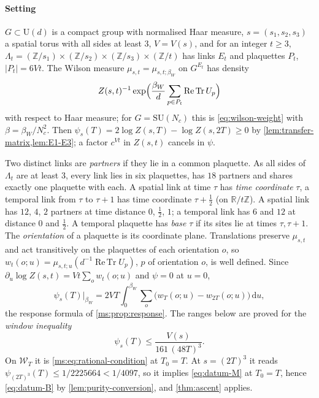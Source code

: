 \documentclass[11pt,a4paper]{amsart}
\theoremstyle{definition}
\theoremstyle{remark}
\numberwithin{equation}{section}
\DeclareMathOperator{\ReTr}{Re\,Tr}  %
\newcommand{\R}{\mathbb{R}}          %
\newcommand{\Z}{\mathbb{Z}}          %
\newcommand{\Wwin}{\mathcal{W}}      %
\newcommand{\abs}[1]{\lvert #1\rvert}      %
\newcommand{\dd}{\,\mathrm{d}}             %
\newcommand{\SU}{\mathrm{SU}}              %
\newcommand{\U}{\mathrm{U}}                %
\newcommand{\Zpart}[2]{Z(#1,#2)}           %
\newcommand{\psiT}[2]{\psi_{#1}(#2)}       %
\newcommand{\Vol}[1]{V(#1)}                %
\newcommand{\cube}[1]{(2#1)^3}             %
\newcommand{\dconst}{\frac{1}{4097}}       %
\newcommand{\dconstinl}{1/4097}            %
\newcommand{\Tzero}{T_0}                   %
\newcommand{\betaW}{\beta_{W}}             %
\begin{document}
\paragraph{Setting}
$G\subset\U(d)$ is a compact group with normalised Haar measure, $s=(s_1,s_2,s_3)$ a spatial torus with all sides at least $3$, $V=\Vol{s}$, and for an integer $t\ge3$, $\Lambda_t=(\Z/s_1)\times(\Z/s_2)\times(\Z/s_3)\times(\Z/t)$ has links $E_t$ and plaquettes $P_t$, $\abs{P_t}=6Vt$. The Wilson measure $\mu_{s,t}=\mu_{s,t;\betaW}$ on $G^{E_t}$ has density
\begin{equation}\label{eq:ranges-weight}
\Zpart{s}{t}^{-1}\exp\Bigl(\frac{\betaW}{d}\sum_{p\in P_t}\ReTr U_p\Bigr)
\end{equation}
with respect to Haar measure; for $G=\SU(N_c)$ this is \eqref{eq:wilson-weight} with $\beta=\betaW/N_c^2$. Then $\psiT{s}{T}=2\log\Zpart{s}{T}-\log\Zpart{s}{2T}\ge0$ by \cref{lem:transfer-matrix,lem:E1-E3}; a factor $c^{Vt}$ in $\Zpart{s}{t}$ cancels in $\psi$.

Two distinct links are \emph{partners} if they lie in a common plaquette. As all sides of $\Lambda_t$ are at least $3$, every link lies in six plaquettes, has $18$ partners and shares exactly one plaquette with each. A spatial link at time $\tau$ has \emph{time coordinate} $\tau$, a temporal link from $\tau$ to $\tau+1$ has time coordinate $\tau+\frac12$ (on $\R/t\Z$). A spatial link has $12$, $4$, $2$ partners at time distance $0$, $\frac12$, $1$; a temporal link has $6$ and $12$ at distance $0$ and $\frac12$. A temporal plaquette has \emph{base} $\tau$ if its sites lie at times $\tau,\tau+1$. The \emph{orientation} of a plaquette is its coordinate plane. Translations preserve $\mu_{s,t}$ and act transitively on the plaquettes of each orientation $o$, so $w_t(o;u)=\mu_{s,t;u}(d^{-1}\ReTr U_p)$, $p$ of orientation $o$, is well defined. Since $\partial_u\log\Zpart{s}{t}=Vt\sum_ow_t(o;u)$ and $\psi=0$ at $u=0$,
\begin{equation}\label{eq:ranges-response}
\psiT{s}{T}\big|_{\betaW}=2VT\int_0^{\betaW}\sum_{o}\bigl(w_T(o;u)-w_{2T}(o;u)\bigr)\dd u ,
\end{equation}
the response formula of \cref{ms:prop:response}. The ranges below are proved for the \emph{window inequality}
\begin{equation}\label{eq:ranges-window}
\psiT{s}{T}\le\frac{\Vol{s}}{161\,(48T)^3}.
\end{equation}
On $\Wwin_{T}$ it is \eqref{ms:eq:rational-condition} at $\Tzero=T$. At $s=\cube{T}$ it reads $\psiT{\cube{T}}{T}\le1/2225664<\dconstinl$, so it implies \eqref{eq:datum-M} at $\Tzero=T$, hence \eqref{eq:datum-B} by \cref{lem:purity-conversion}, and \cref{thm:ascent} applies.
\end{document}
